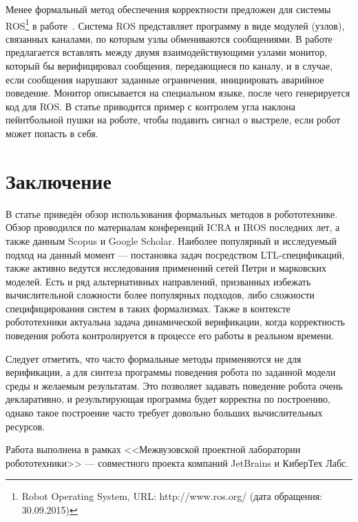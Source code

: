 \documentclass[conference]{IEEEtran}
\begin{document}
Менее формальный метод обеспечения корректности предложен для системы 
ROS\footnote{Robot Operating System, URL: http://www.ros.org/ (дата обращения: 30.09.2015)}
в работе~\cite{huang2014rosrv}. Система ROS представляет программу в виде 
модулей (узлов), связанных каналами, по которым узлы обмениваются сообщениями. 
В работе предлагается вставлять между двумя взаимодействующими узлами монитор, 
который бы верифицировал сообщения, передающиеся по каналу, и в случае, если 
сообщения нарушают заданные ограничения, инициировать аварийное поведение. 
Монитор описывается на специальном языке, после чего генерируется код для ROS. 
В статье приводится пример с контролем угла наклона пейнтбольной пушки на 
роботе, чтобы подавить сигнал о выстреле, если робот может попасть в себя.

\section{Заключение}
В статье приведён обзор использования формальных методов в робототехнике. Обзор 
проводился по материалам конференций ICRA и IROS последних лет, а также 
данным Scopus и Google Scholar. Наиболее популярный и исследуемый подход на 
данный момент --- постановка задач посредством LTL-спецификаций, также 
активно ведутся исследования применений сетей Петри и марковских моделей. Есть 
и ряд альтернативных направлений, призванных избежать вычислительной сложности 
более популярных подходов, либо сложности специфицирования систем в таких 
формализмах. Также в контексте робототехники актуальна задача динамической верификации, 
когда корректность поведения робота контролируется в процессе его работы в реальном времени.

Следует отметить, что часто формальные методы применяются не для верификации, 
а для синтеза программы поведения робота по заданной модели среды и желаемым результатам. Это позволяет 
задавать поведение робота очень декларативно, и результирующая программа будет 
корректна по построению, однако такое построение часто требует довольно больших вычислительных ресурсов.

Работа выполнена в рамках <<Межвузовской проектной лаборатории робототехники>> --- совместного
проекта компаний JetBrains и КиберТех Лабс.



\end{document}
